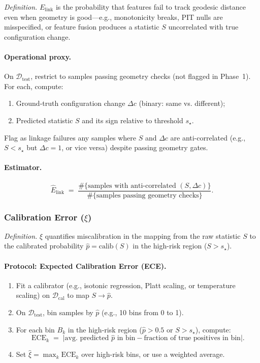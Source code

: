 \documentclass[11pt]{article}
\theoremstyle{remark}
\theoremstyle{plain}
\begin{document}
\emph{Definition.} $E_{\mathrm{link}}$ is the probability that features fail to track geodesic distance even when geometry is good—e.g., monotonicity breaks, PIT nulls are misspecified, or feature fusion produces a statistic $S$ uncorrelated with true configuration change.

\paragraph{Operational proxy.}
On $\mathcal{D}_{\mathrm{test}}$, restrict to samples passing geometry checks (not flagged in Phase~1). For each, compute:
\begin{enumerate}[label=(\alph*),leftmargin=*]
  \item Ground-truth configuration change $\Delta c$ (binary: same vs. different);
  \item Predicted statistic $S$ and its sign relative to threshold $s_\star$.
\end{enumerate}
Flag as linkage failures any samples where $S$ and $\Delta c$ are anti-correlated (e.g., $S < s_\star$ but $\Delta c = 1$, or vice versa) despite passing geometry gates.

\paragraph{Estimator.}
\[
\hat E_{\mathrm{link}}
\;=\;
\frac{\#\{\text{samples with anti-correlated }(S, \Delta c)\}}{\#\{\text{samples passing geometry checks}\}}.
\]

\subsubsection{Calibration Error ($\xi$)}
\label{subsubsec:xi}

\emph{Definition.} $\xi$ quantifies miscalibration in the mapping from the raw statistic $S$ to the calibrated probability $\hat p = \text{calib}(S)$ in the high-risk region ($S > s_\star$).

\paragraph{Protocol: Expected Calibration Error (ECE).}
\begin{enumerate}[label=\arabic*.,leftmargin=*]
  \item Fit a calibrator (e.g., isotonic regression, Platt scaling, or temperature scaling) on $\mathcal{D}_{\mathrm{cal}}$ to map $S \to \hat p$.
  \item On $\mathcal{D}_{\mathrm{test}}$, bin samples by $\hat p$ (e.g., 10 bins from 0 to 1).
  \item For each bin $B_k$ in the high-risk region ($\hat p > 0.5$ or $S > s_\star$), compute:
  \[
  \text{ECE}_k
  \;=\;
  \bigl|\text{avg. predicted } \hat p \text{ in bin} - \text{fraction of true positives in bin}\bigr|.
  \]
  \item Set $\hat\xi = \max_k \text{ECE}_k$ over high-risk bins, or use a weighted average.
\end{enumerate}
\end{document}
